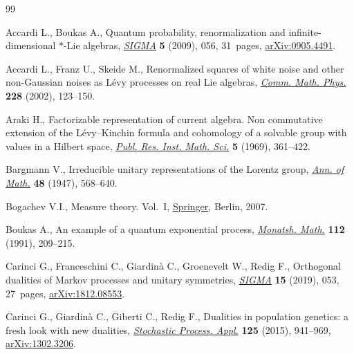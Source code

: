 \documentclass[pdftex]{sigma}
\numberwithin{equation}{section}
\newcommand{\1}{\mathbbm{1}}
\begin{document}
%
%

\begin{thebibliography}{99}
\footnotesize\itemsep=0pt

Accardi L., Boukas A., Quantum probability, renormalization and
 infinite-dimensional {$\ast$}-{L}ie algebras, \href{https://doi.org/10.3842/SIGMA.2009.056}{\textit{SIGMA}} \textbf{5}
 (2009), 056, 31~pages, \href{https://arxiv.org/abs/0905.4491}{arXiv:0905.4491}.

Accardi L., Franz U., Skeide M., Renormalized squares of white noise and other
 non-{G}aussian noises as {L}\'evy processes on real {L}ie algebras,
 \href{https://doi.org/10.1007/s002200200647}{\textit{Comm. Math. Phys.}} \textbf{228} (2002), 123--150.

Araki H., Factorizable representation of current algebra. {N}on commutative
 extension of the {L}\'evy--{K}inchin formula and cohomology of a solvable
 group with values in a {H}ilbert space, \href{https://doi.org/10.2977/prims/1195194390}{\textit{Publ. Res. Inst. Math. Sci.}}
 \textbf{5} (1969), 361--422.

Bargmann V., Irreducible unitary representations of the {L}orentz group,
 \href{https://doi.org/10.2307/1969129}{\textit{Ann. of Math.}} \textbf{48} (1947), 568--640.

Bogachev V.I., Measure theory. {V}ol.~{I}, \href{https://doi.org/10.1007/978-3-540-34514-5}{Springer}, Berlin, 2007.

Boukas A., An example of a quantum exponential process, \href{https://doi.org/10.1007/BF01297339}{\textit{Monatsh. Math.}}
 \textbf{112} (1991), 209--215.

Carinci G., Franceschini C., Giardin\`a C., Groenevelt W., Redig F., Orthogonal
 dualities of {M}arkov processes and unitary symmetries, \href{https://doi.org/10.3842/SIGMA.2019.053}{\textit{SIGMA}}
 \textbf{15} (2019), 053, 27~pages, \href{https://arxiv.org/abs/1812.08553}{arXiv:1812.08553}.

Carinci G., Giardin\`a C., Giberti C., Redig F., Dualities in population
 genetics: a fresh look with new dualities, \href{https://doi.org/10.1016/j.spa.2014.10.009}{\textit{Stochastic Process. Appl.}}
 \textbf{125} (2015), 941--969, \href{https://arxiv.org/abs/1302.3206}{arXiv:1302.3206}.


\end{thebibliography}
\end{document}
